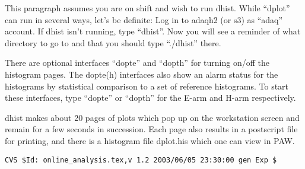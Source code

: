 \par 
This paragraph assumes you are on shift
and wish to run dhist.  
While ``dplot'' can run in
several ways, let's be definite:  Log in to
adaqh2 (or s3) as ``adaq'' account.  If dhist
isn't running, type ``dhist''.  Now you will
see a reminder of what directory to go to and
that you should type ``./dhist'' there.

\par 
There are optional interfaces ``dopte'' and 
``dopth'' for turning on/off the histogram
pages.  The dopte(h) interfaces also show an 
alarm status for the histograms by statistical
comparison to a set of reference histograms.
To start these interfaces, type ``dopte'' or
``dopth'' for the E-arm and H-arm respectively.

\par 
dhist makes about 20 pages of plots which pop
up on the workstation screen and remain for
a few seconds in succession.  Each page also
results in a postscript file for printing, and
there is a histogram file dplot.his which one
can view in PAW.    

%
%
{\small
\begin{verbatim}CVS $Id: online_analysis.tex,v 1.2 2003/06/05 23:30:00 gen Exp $\end{verbatim}
}
